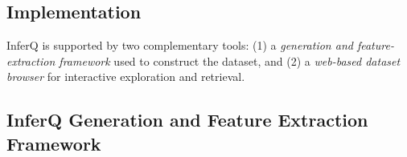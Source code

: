 \begin{appendices}








\section{Implementation}
\label{sec:imp}

InferQ is supported by two complementary tools:
(1) a \textit{generation and feature-extraction framework} used to construct the dataset, and
(2) a \textit{web-based dataset browser} for interactive exploration and retrieval.

\subsection{InferQ Generation and Feature Extraction Framework}


\end{appendices}
